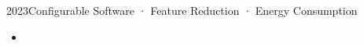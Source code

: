  {2023}{Configurable Software · Feature Reduction · Energy Consumption}{}
{\begin{itemize}
\item {}
\end{itemize}}